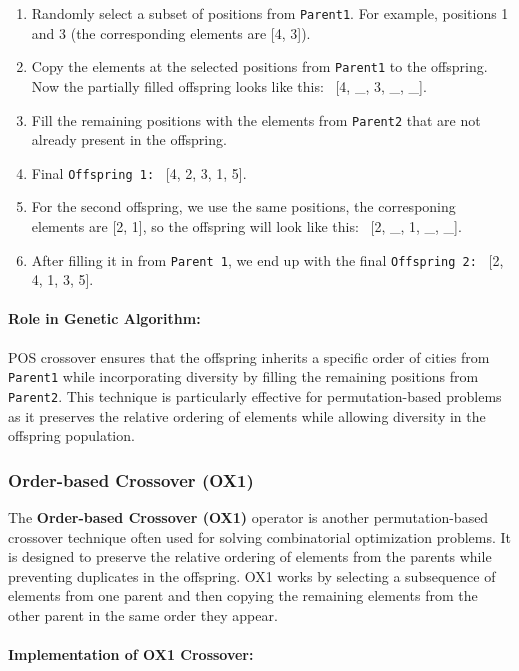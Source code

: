 \documentclass[11pt]{article}
\begin{document}
\begin{enumerate}
    \item Randomly select a subset of positions from \texttt{Parent1}. For example, positions 1 and 3 (the corresponding elements are [4, 3]).
    \item Copy the elements at the selected positions from \texttt{Parent1} to the offspring. Now the partially filled offspring looks like this: \ [4, \_, 3, \_, \_].
    \item Fill the remaining positions with the elements from \texttt{Parent2} that are not already present in the offspring.
    \item Final \texttt{Offspring 1:} \ [4, 2, 3, 1, 5].
    \item For the second offspring, we use the same positions, the corresponing elements are [2, 1], so the offspring will look like this: \ [2, \_, 1, \_, \_].
    \item After filling it in from \texttt{Parent 1}, we end up with the final \texttt{Offspring 2:} \ [2, 4, 1, 3, 5].
\end{enumerate}



\paragraph{Role in Genetic Algorithm:}

POS crossover ensures that the offspring inherits a specific order of cities from \texttt{Parent1} while incorporating diversity by filling the remaining positions from \texttt{Parent2}. This technique is particularly effective for permutation-based problems as it preserves the relative ordering of elements while allowing diversity in the offspring population.

\subsubsection{Order-based Crossover (OX1)}

The \textbf{Order-based Crossover (OX1)} operator is another permutation-based crossover technique often used for solving combinatorial optimization problems. It is designed to preserve the relative ordering of elements from the parents while preventing duplicates in the offspring. OX1 works by selecting a subsequence of elements from one parent and then copying the remaining elements from the other parent in the same order they appear.

\paragraph{Implementation of OX1 Crossover:}
\end{document}
